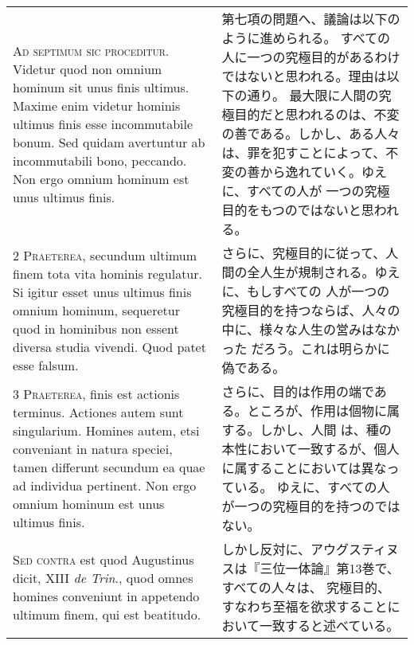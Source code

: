\documentclass[10pt]{jsarticle} %
\begin{document}
\begin{longtable}{p{21em}p{21em}}

{\Huge A}{\scshape d septimum sic proceditur}. Videtur
quod non omnium hominum sit unus finis ultimus. Maxime enim videtur
hominis ultimus finis esse incommutabile bonum. Sed quidam avertuntur ab
incommutabili bono, peccando. Non ergo omnium hominum est unus ultimus
finis.


&

第七項の問題へ、議論は以下のように進められる。
すべての人に一つの究極目的があるわけではないと思われる。理由は以下の通り。
最大限に人間の究極目的だと思われるのは、不変の善である。しかし、ある人々
 は、罪を犯すことによって、不変の善から逸れていく。ゆえに、すべての人が
 一つの究極目的をもつのではないと思われる。


\\


{\scshape 2 Praeterea}, secundum ultimum finem tota
vita hominis regulatur. Si igitur esset unus ultimus finis omnium
hominum, sequeretur quod in hominibus non essent diversa studia
vivendi. Quod patet esse falsum.


&


さらに、究極目的に従って、人間の全人生が規制される。ゆえに、もしすべての
 人が一つの究極目的を持つならば、人々の中に、様々な人生の営みはなかった
 だろう。これは明らかに偽である。

\\


{\scshape 3 Praeterea}, finis est actionis
terminus. Actiones autem sunt singularium. Homines autem, etsi
conveniant in natura speciei, tamen differunt secundum ea quae ad
individua pertinent. Non ergo omnium hominum est unus ultimus finis.


&


さらに、目的は作用の端である。ところが、作用は個物に属する。しかし、人間
 は、種の本性において一致するが、個人に属することにおいては異なっている。
 ゆえに、すべての人が一つの究極目的を持つのではない。

\\


{\scshape Sed contra} est quod Augustinus dicit,
XIII {\itshape de Trin}., quod omnes homines conveniunt in appetendo ultimum finem,
qui est beatitudo.


&

しかし反対に、アウグスティヌスは『三位一体論』第13巻で、すべての人々は、
 究極目的、すなわち至福を欲求することにおいて一致すると述べている。


\\



\end{longtable}
\end{document}
